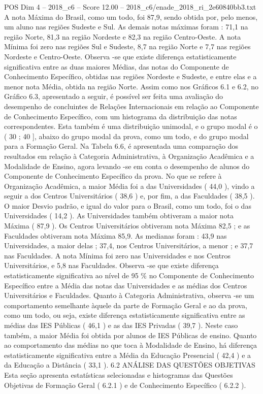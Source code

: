 \begin{textsample}{POS Dim 4 – 2018\_c6 – Score 12.00 – 2018\_c6/enade\_2018\_ri\_2e60840bb3.txt}
A nota Máxima do Brasil, como um todo, foi 87,9, sendo obtida por, pelo menos, um aluno nas regiões Sudeste e Sul.
As demais notas máximas foram : 71,1 na região Norte, 81,3 na região Nordeste e 82,3 na região Centro-Oeste.
A nota Mínima foi zero nas regiões Sul e Sudeste, 8,7 na região Norte e 7,7 nas regiões Nordeste e Centro-Oeste.
Observa -se que existe diferença estatisticamente significativa entre as duas maiores Médias, das notas do Componente de Conhecimento Específico, obtidas nas regiões Nordeste e Sudeste, e entre elas e a menor nota Média, obtida na região Norte.
Assim como nos Gráficos 6.1 e 6.2, no Gráfico 6.3, apresentado a seguir, é possível ser feita uma avaliação do desempenho de concluintes de Relações Internacionais em relação ao Componente de Conhecimento Específico, com um histograma da distribuição das notas correspondentes.
Esta também é uma distribuição unimodal, e o grupo modal é o ( 30 ; 40 ], abaixo do grupo modal da prova, como um todo, e do grupo modal para a Formação Geral.
Na Tabela 6.6, é apresentada uma comparação dos resultados em relação à Categoria Administrativa, à Organização Acadêmica e a Modalidade de Ensino, agora levando -se em conta o desempenho de alunos do Componente de Conhecimento Específico da prova.
No que se refere à Organização Acadêmica, a maior Média foi a das Universidades ( 44,0 ), vindo a seguir a dos Centros Universitários ( 38,6 ) e, por fim, a das Faculdades ( 38,5 ).
O maior Desvio padrão, e igual do valor para o Brasil, como um todo, foi o das Universidades ( 14,2 ).
As Universidades também obtiveram a maior nota Máxima ( 87,9 ).
Os Centros Universitários obtiveram nota Máxima 82,5 ; e as Faculdades obtiveram nota Máxima 85,9.
As medianas foram : 43,9 nas Universidades, a maior delas ; 37,4, nos Centros Universitários, a menor ; e 37,7 nas Faculdades.
A nota Mínima foi zero nas Universidades e nos Centros Universitários, e 5,8 nas Faculdades.
Observa -se que existe diferença estatisticamente significativa ao nível de 95 \% no Componente de Conhecimento Específico entre a Média das notas das Universidades e as médias dos Centros Universitários e Faculdades.
Quanto à Categoria Administrativa, observa -se um comportamento semelhante àquele da parte de Formação Geral e ao da prova, como um todo, ou seja, existe diferença estatisticamente significativa entre as médias das IES Públicas ( 46,1 ) e as das IES Privadas ( 39,7 ).
Neste caso também, a maior Média foi obtida por alunos de IES Públicas de ensino.
Quanto ao comportamento das médias no que toca à Modalidade de Ensino, há diferença estatisticamente significativa entre a Média da Educação Presencial ( 42,4 ) e a da Educação a Distância ( 33,1 ). 6.2 ANÁLISE DAS QUESTÕES OBJETIVAS Esta seção apresenta estatísticas selecionadas e histogramas das Questões Objetivas de Formação Geral ( 6.2.1 ) e de Conhecimento Específico ( 6.2.2 ).

\end{textsample}
